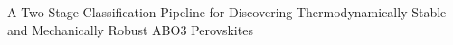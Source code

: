 \documentclass[]{article}
\begin{document}
A Two-Stage Classification Pipeline for Discovering Thermodynamically Stable and Mechanically Robust ABO3 Perovskites
\end{document}
